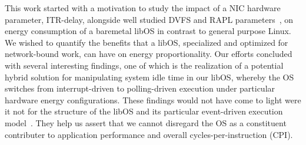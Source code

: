 This work
started with a motivation to study the impact
of a NIC hardware parameter, ITR-delay,
alongside well studied DVFS and RAPL parameters~\cite{rapl2015, rapl2018},
on energy consumption
of a baremetal libOS in contrast to general purpose Linux.
We wished to quantify the benefits that a libOS,
specialized and optimized for network-bound work,
can have on energy proportionality.
Our efforts concluded with several interesting findings,
one of which is the realization of a potential hybrid solution
for manipulating system idle time in our libOS,
whereby the OS switches from interrupt-driven
to polling-driven execution
under particular hardware energy configurations.
These findings would not have come to light
were it not for the structure of the libOS
and its particular event-driven execution model~\cite{seda, unikernels}.
They help us assert that we cannot disregard the OS
as a constituent contributer to application performance and overall cycles-per-instruction (CPI).

%			



 
